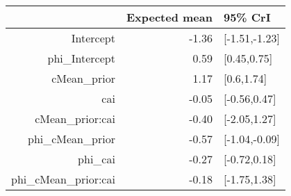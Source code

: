 \begin{tabular}{rrl}
  \hline
 & Expected mean & 95\% CrI \\ 
  \hline
Intercept & -1.36 & [-1.51,-1.23] \\ 
  phi\_Intercept & 0.59 & [0.45,0.75] \\ 
  cMean\_prior & 1.17 & [0.6,1.74] \\ 
  cai & -0.05 & [-0.56,0.47] \\ 
  cMean\_prior:cai & -0.40 & [-2.05,1.27] \\ 
  phi\_cMean\_prior & -0.57 & [-1.04,-0.09] \\ 
  phi\_cai & -0.27 & [-0.72,0.18] \\ 
  phi\_cMean\_prior:cai & -0.18 & [-1.75,1.38] \\ 
   \hline
\end{tabular}

